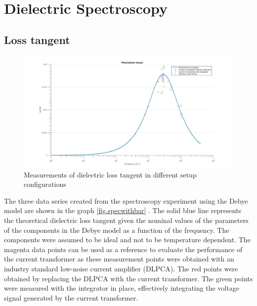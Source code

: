 \section{Dielectric Spectroscopy}
\subsection{Loss tangent}
\begin{figure}[htbp]
  \centering
  \centerline{\includegraphics[width=\textwidth]{figures/Results/Spectroscopy/spectroscopywithoutbars}}
  \caption[Kurze Abbildungsbeschreibung]{Measurements of dielectric loss tangent in different setup configurations}
\label{fig.specwithbar}
  \label{fig.spectroscopy}

\end{figure}
The three data series created from the spectroscopy experiment using the Debye model are shown in the graph \ref{fig.specwithbar} . The solid blue line represents the theoretical  dielectric loss tangent given the nominal values of the parameters of the components in the Debye model
as a function of the frequency.
The components were assumed to be ideal and not to be temperature dependent.
The magenta data points can be used as a reference to evaluate the performance of the current transformer as these measurement points
were obtained with an industry standard low-noise current amplifier (DLPCA). 
The red points were obtained by replacing the DLPCA with the current transformer.
The green points were measured with the integrator in place, effectively integrating the voltage signal generated by the current transformer.

